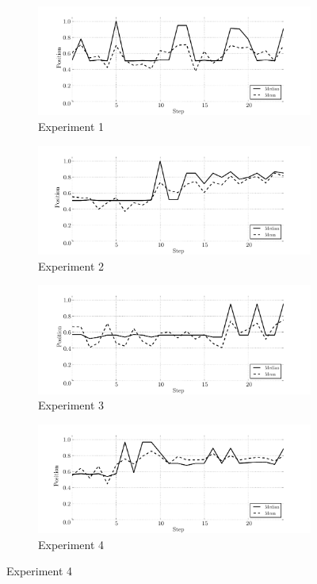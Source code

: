 \begin{figure}[!htbp]
    \centering
    \begin{subfigure}[t]{0.49\textwidth}
        \includegraphics[width=\textwidth]{ColdWar/Figures/Exp1_uswin_trace}
        \caption{Experiment 1}
    \end{subfigure}
    \begin{subfigure}[t]{0.49\textwidth}
        \includegraphics[width=\textwidth]{ColdWar/Figures/Exp2_uswin_trace}
        \caption{Experiment 2}
    \end{subfigure}

    \begin{subfigure}[t]{0.49\textwidth}
        \includegraphics[width=\textwidth]{ColdWar/Figures/Exp3_uswin_trace}
        \caption{Experiment 3}
    \end{subfigure}
    \begin{subfigure}[t]{0.49\textwidth}
        \includegraphics[width=\textwidth]{ColdWar/Figures/Exp4_uswin_trace}
        \caption{Experiment 4}
    \end{subfigure}


\end{figure}
